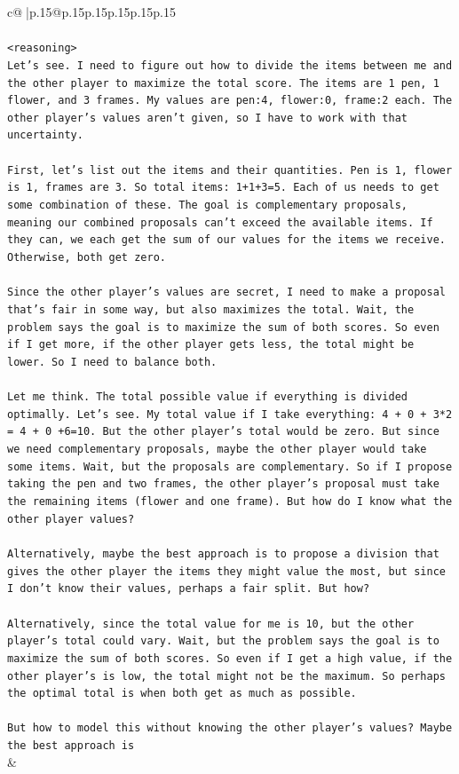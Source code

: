 \documentclass{article}
\begin{document}
{\begin{supertabular}{c@{$\;$}|p{.15\linewidth}@{}p{.15\linewidth}p{.15\linewidth}p{.15\linewidth}p{.15\linewidth}p{.15\linewidth}}
{{{\\ 
\\ 
\texttt{<reasoning>} \\
\texttt{Let's see. I need to figure out how to divide the items between me and the other player to maximize the total score. The items are 1 pen, 1 flower, and 3 frames. My values are pen:4, flower:0, frame:2 each. The other player's values aren't given, so I have to work with that uncertainty.} \\
\\ 
\texttt{First, let's list out the items and their quantities. Pen is 1, flower is 1, frames are 3. So total items: 1+1+3=5. Each of us needs to get some combination of these. The goal is complementary proposals, meaning our combined proposals can't exceed the available items. If they can, we each get the sum of our values for the items we receive. Otherwise, both get zero.} \\
\\ 
\texttt{Since the other player's values are secret, I need to make a proposal that's fair in some way, but also maximizes the total. Wait, the problem says the goal is to maximize the sum of both scores. So even if I get more, if the other player gets less, the total might be lower. So I need to balance both.} \\
\\ 
\texttt{Let me think. The total possible value if everything is divided optimally. Let's see. My total value if I take everything: 4 + 0 + 3*2 = 4 + 0 +6=10. But the other player's total would be zero. But since we need complementary proposals, maybe the other player would take some items. Wait, but the proposals are complementary. So if I propose taking the pen and two frames, the other player's proposal must take the remaining items (flower and one frame). But how do I know what the other player values?} \\
\\ 
\texttt{Alternatively, maybe the best approach is to propose a division that gives the other player the items they might value the most, but since I don't know their values, perhaps a fair split. But how?} \\
\\ 
\texttt{Alternatively, since the total value for me is 10, but the other player's total could vary. Wait, but the problem says the goal is to maximize the sum of both scores. So even if I get a high value, if the other player's is low, the total might not be the maximum. So perhaps the optimal total is when both get as much as possible.} \\
\\ 
\texttt{But how to model this without knowing the other player's values? Maybe the best approach is} \\
            }
        }
    }
    & \\ \\


\end{supertabular}}
\end{document}
